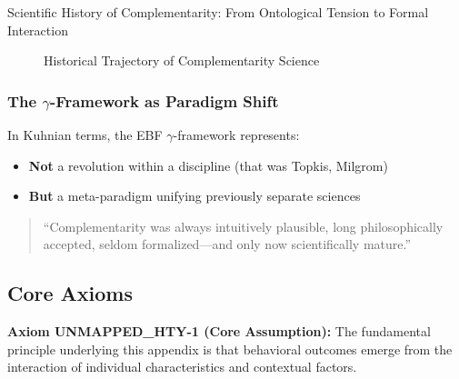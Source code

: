 \begin{chapter}{Scientific History of Complementarity: From Ontological Tension to Formal Interaction}
\begin{figure}[h]
\caption{Historical Trajectory of Complementarity Science}
\label{fig:historical-trajectory}
\end{figure}

\subsubsection{The $\gamma$-Framework as Paradigm Shift}

In Kuhnian terms, the EBF $\gamma$-framework represents:

\begin{itemize}
    \item \textbf{Not} a revolution within a discipline (that was Topkis, Milgrom)
    \item \textbf{But} a meta-paradigm unifying previously separate sciences
\end{itemize}

\begin{quote}
``Complementarity was always intuitively plausible, long philosophically accepted, seldom formalized---and only now scientifically mature.''
\end{quote}



\subsection{Core Axioms}
\label{sec:hty-axioms}

\begin{tcolorbox}[colback=yellow!5!white,colframe=yellow!75!black,title=Axiom UNMAPPED_HTY-1: Fundamental Principle]
\textbf{Axiom UNMAPPED_HTY-1 (Core Assumption):}
The fundamental principle underlying this appendix is that behavioral outcomes
emerge from the interaction of individual characteristics and contextual factors.
\end{tcolorbox}


\end{chapter}
